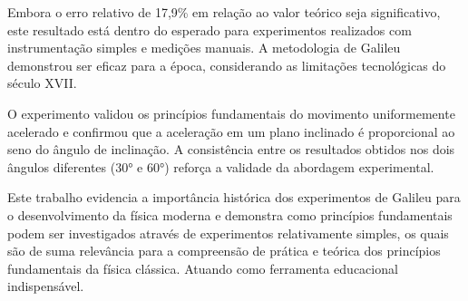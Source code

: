\documentclass[a4paper, 12pt]{article}
\begin{document}
Embora o erro relativo de 17,9\% em relação ao valor teórico seja significativo, este resultado está dentro do esperado para experimentos realizados com instrumentação simples e medições manuais. A metodologia de Galileu demonstrou ser eficaz para a época, considerando as limitações tecnológicas do século XVII.

O experimento validou os princípios fundamentais do movimento uniformemente acelerado e confirmou que a aceleração em um plano inclinado é proporcional ao seno do ângulo de inclinação. A consistência entre os resultados obtidos nos dois ângulos diferentes (30° e 60°) reforça a validade da abordagem experimental.

Este trabalho evidencia a importância histórica dos experimentos de Galileu para o desenvolvimento da física moderna e demonstra como princípios fundamentais podem ser investigados através de experimentos relativamente simples, os quais são de suma relevância para a compreensão de prática e teórica dos princípios fundamentais da física clássica. Atuando como ferramenta educacional indispensável.




\end{document}
